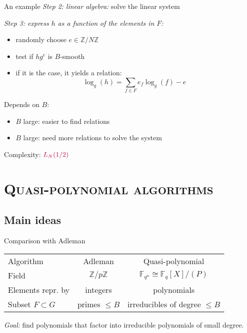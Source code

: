 \documentclass[xcolor=x11names,compress]{beamer}
\theoremstyle{break}
\theoremstyle{sc}
\theoremstyle{definition}
\theoremstyle{remark}
\begin{document}
\begin{frame}{An example}
  \emph{Step 2: linear algebra:} solve the linear system
  
  \emph{Step 3: express $h$ as a function of the elements in $F$:}
  \begin{itemize}
     \item randomly choose $e\in \mathbb{Z}/N\mathbb{Z}$
    \item test if $hg^e$ is $B$-smooth
    \item if it is the case, it yields a relation:
     \[
      \log_g(h) = \sum_{f\in F}e_f\log_g(f) - e
      \]
  \end{itemize}

 Depends on $B$:
  \begin{itemize}
    \item $B$ large: easier to find relations
    \item $B$ large: need more relations to solve the system
  \end{itemize}
  Complexity: $\textcolor{purple}{L_N(1/2)}$

\end{frame}

\section{\scshape Quasi-polynomial algorithms} 
\subsection{Main ideas}
\begin{frame}{Comparison with Adleman}
  \begin{center}
  \begin{tabular}[here]{lcc}
  Algorithm  & Adleman & Quasi-polynomial \\
  Field & $\mathbb{Z}/p\mathbb{Z}$ & $\mathbb{F}_{q^n}\cong \mathbb{F}_q[X]/(P)$ \\
  Elements repr. by & integers & polynomials \\
  Subset $F\subset G$ & primes $\leq B$ & irreducibles of degree $\leq B$ \\
  \end{tabular}
  \end{center}

  \emph{Goal:} find polynomials that factor into irreducible polynomials of small degree.
\end{frame}
\end{document}
